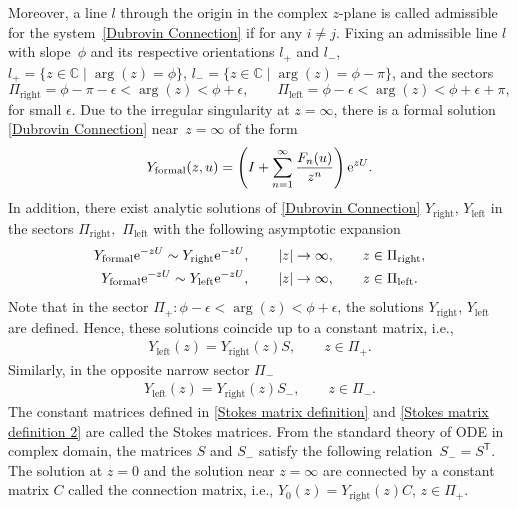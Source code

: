 \documentclass[11pt]{article}
\numberwithin{equation}{section}
\numberwithin{equation}{section}
\begin{document}
Moreover, a line \(l\) through the origin in the complex \(z\)-plane is called admissible for the system~\eqref{Dubrovin Connection} if
 for any $ i \neq j$.
Fixing an admissible line \(l\) with slope~\(\phi\) and its respective orientations \(l_{+}\) and \(l_{-}\),
$
 l_{+} = \{ z \in \mathbb{C}\mid \arg(z) = \phi\}$, $
 l_{-} = \{ z \in \mathbb{C}\mid \arg(z) = \phi-\pi\}$,
and the sectors
\[
 \Pi_{\text{right}} = \phi-\pi-\epsilon < \arg(z) < \phi+\epsilon,\qquad
 \Pi_{\text{left}} = \phi-\epsilon < \arg(z) < \phi+\epsilon+\pi,
\]
for small \(\epsilon\). Due to the irregular singularity at \(z=\infty\), there is a formal solution \eqref{Dubrovin Connection} near~${z=\infty}$ of the form
\begin{gather}\label{formal solution of Dubrovin connection at infinity}
Y_{\text{formal}}(z,u) = \left(I+\sum_{n=1}^{\infty}\frac{F_n(u)}{z^n} \right){\rm e}^{zU}.
\end{gather}
In addition, there exist analytic solutions of \eqref{Dubrovin Connection} \(Y_{\text{right}}\), \(Y_{\text{left}}\) in the sectors \(\Pi_{\text{right}},\) \(\Pi_{\text{left}}\) with the following asymptotic expansion
\begin{gather*}
 Y_{\text{formal}}{\rm e}^{-zU} \sim Y_{\text{right}}{\rm e}^{-zU} , \qquad \lvert z \rvert \to \infty, \qquad z \in \Pi_{\text{right}},\\
 Y_{\text{formal}}{\rm e}^{-zU} \sim Y_{\text{left}}{\rm e}^{-zU} , \qquad \lvert z \rvert \to \infty, \qquad z \in \Pi_{\text{left}}.
\end{gather*}
Note that in the sector
$
\Pi_{+} \colon \phi-\epsilon < \arg(z) < \phi+\epsilon$,
the solutions \(Y_{\text{right}}\), \(Y_{\text{left}}\) are defined. Hence, these solutions coincide up to a constant matrix, i.e.,
\begin{gather}\label{Stokes matrix definition}
 Y_{\text{left}}(z) = Y_{\text{right}}(z)S, \qquad z \in \Pi_{+}.
\end{gather}
Similarly, in the opposite narrow sector $\Pi_{-}$
\begin{gather}\label{Stokes matrix definition 2}
 Y_{\text{left}}(z) = Y_{\text{right}}(z)S_{-}, \qquad z \in \Pi_{-}.
\end{gather}
The constant matrices defined in \eqref{Stokes matrix definition} and \eqref{Stokes matrix definition 2} are called the Stokes matrices. From the standard theory of ODE in complex domain, the matrices $S$ and $S_{-}$ satisfy the following relation~${
S_{-}=S^{\mathsf T}}$.
The solution at \(z=0\) and the solution near \(z=\infty\) are connected by a constant matrix \(C\) called the connection matrix, i.e.,
$Y_{0}(z) = Y_{\text{right}}(z)C$, $ z \in \Pi_{+}$.
\end{document}
